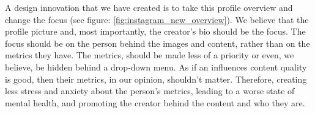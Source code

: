 \documentclass{sigchi}
\begin{document}
	A design innovation that we have created is to take this profile overview and change the focus (see figure: \ref{fig:instagram_new_overview}). We believe that the profile picture and, most importantly, the creator's bio should be the focus. The focus should be on the person behind the images and content, rather than on the metrics they have. The metrics, should be made less of a priority or even, we believe, be hidden behind a drop-down menu. As if an influences content quality is good, then their metrics, in our opinion, shouldn't matter. Therefore, creating less stress and anxiety about the person's metrics, leading to a worse state of mental health, and promoting the creator behind the content and who they are.


\balance{}



\end{document}
